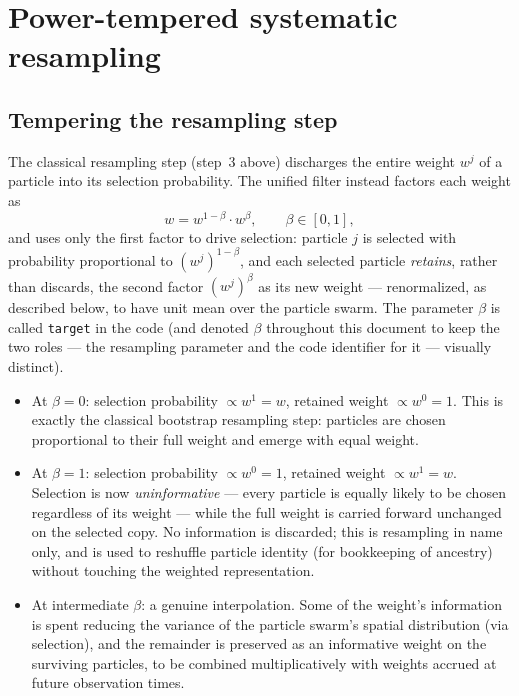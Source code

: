 \documentclass[11pt]{article}
\begin{document}
\section{Power-tempered systematic resampling}
\label{sec:resample}

\subsection{Tempering the resampling step}

The classical resampling step (step~3 above) discharges the entire weight
$w^j$ of a particle into its selection probability. The unified filter instead
factors each weight as
\[
w = w^{1-\beta} \cdot w^{\beta}, \qquad \beta \in [0,1],
\]
and uses only the first factor to drive selection: particle $j$ is selected
with probability proportional to $(w^j)^{1-\beta}$, and each selected particle
\emph{retains}, rather than discards, the second factor $(w^j)^{\beta}$ as its
new weight — renormalized, as described below, to have unit mean over the
particle swarm. The parameter $\beta$ is called \texttt{target} in the code
(and denoted $\beta$ throughout this document to keep the two roles — the
resampling parameter and the code identifier for it — visually distinct).

\begin{itemize}
\item At $\beta = 0$: selection probability $\propto w^1 = w$, retained weight
$\propto w^0 = 1$. This is exactly the classical bootstrap resampling step:
particles are chosen proportional to their full weight and emerge with equal
weight.
\item At $\beta = 1$: selection probability $\propto w^0 = 1$, retained weight
$\propto w^1 = w$. Selection is now \emph{uninformative} — every particle is
equally likely to be chosen regardless of its weight — while the full weight is
carried forward unchanged on the selected copy. No information is discarded;
this is resampling in name only, and is used to reshuffle particle identity
(for bookkeeping of ancestry) without touching the weighted representation.
\item At intermediate $\beta$: a genuine interpolation. Some of the weight's
information is spent reducing the variance of the particle swarm's spatial
distribution (via selection), and the remainder is preserved as an informative
weight on the surviving particles, to be combined multiplicatively with weights
accrued at future observation times.
\end{itemize}
\end{document}
